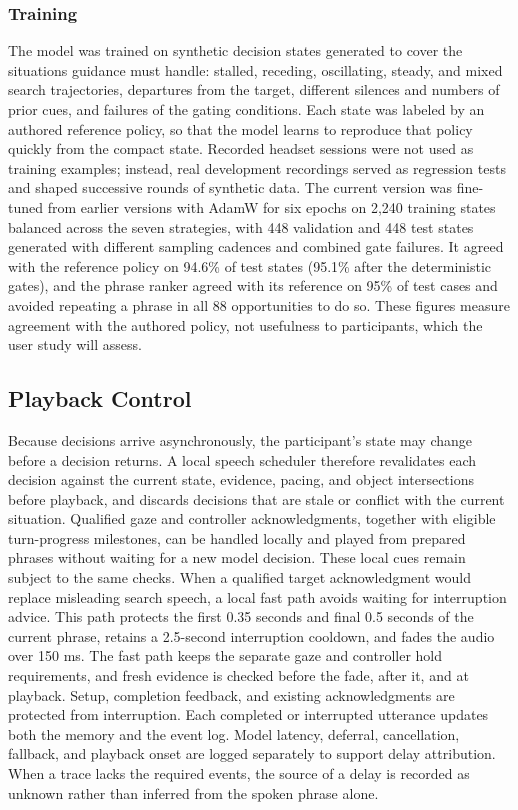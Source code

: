 \subsubsection{Training}
The model was trained on synthetic decision states generated to cover the situations guidance must handle: stalled, receding, oscillating, steady, and mixed search trajectories, departures from the target, different silences and numbers of prior cues, and failures of the gating conditions. Each state was labeled by an authored reference policy, so that the model learns to reproduce that policy quickly from the compact state. Recorded headset sessions were not used as training examples; instead, real development recordings served as regression tests and shaped successive rounds of synthetic data. The current version was fine-tuned from earlier versions with AdamW for six epochs on 2,240 training states balanced across the seven strategies, with 448 validation and 448 test states generated with different sampling cadences and combined gate failures. It agreed with the reference policy on 94.6\% of test states (95.1\% after the deterministic gates), and the phrase ranker agreed with its reference on 95\% of test cases and avoided repeating a phrase in all 88 opportunities to do so. These figures measure agreement with the authored policy, not usefulness to participants, which the user study will assess.

\subsection{Playback Control}
\label{sec:playback-control}
Because decisions arrive asynchronously, the participant's state may change before a decision returns. A local speech scheduler therefore revalidates each decision against the current state, evidence, pacing, and object intersections before playback, and discards decisions that are stale or conflict with the current situation. Qualified gaze and controller acknowledgments, together with eligible turn-progress milestones, can be handled locally and played from prepared phrases without waiting for a new model decision. These local cues remain subject to the same checks. When a qualified target acknowledgment would replace misleading search speech, a local fast path avoids waiting for interruption advice. This path protects the first 0.35 seconds and final 0.5 seconds of the current phrase, retains a 2.5-second interruption cooldown, and fades the audio over 150 ms. The fast path keeps the separate gaze and controller hold requirements, and fresh evidence is checked before the fade, after it, and at playback. Setup, completion feedback, and existing acknowledgments are protected from interruption. Each completed or interrupted utterance updates both the memory and the event log. Model latency, deferral, cancellation, fallback, and playback onset are logged separately to support delay attribution. When a trace lacks the required events, the source of a delay is recorded as unknown rather than inferred from the spoken phrase alone.

